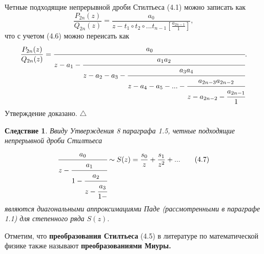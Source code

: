 \documentclass[12pt,a4paper]{article}
\theoremstyle{plain}   \newtheorem{Pro}{Задача}
\newtheorem{Cor}{Следствие}
\begin{document}
Четные подходящие непрерывной дроби Стилтьеса (4.1)
можно записать как
\begin{equation*}
  \frac{P_{2n}(z)}{Q_{2n}(z)}=
  \frac{a_0}
  {z-t_1 \circ t_2 \circ ... t_{n-1}
  [\frac{a_{2n-1}}{1}]},
\end{equation*}
что с учетом (4.6) можно переисать как
\begin{equation*}
  \frac{P_{2n}(z)}{Q_{2n}(z)}=
    \cfrac{a_0}{z-a_1 -
	  \cfrac{a_1 a_2}{z-a_2 -a_3 -
	    \cfrac{a_3 a_4}{z-a_4 -a_5 -...-
		  \cfrac{a_{2n-3}a_{2n-2}}{z-a_{2n-2}-
		    \cfrac{a_{2n-1}}{1
	}}}}}.
\end{equation*}
Утверждение доказано. $ \triangle $
\begin{Cor}
Ввиду Утверждения 8 параграфа 1.5,
четные подходящие непрерывной дроби Стилтьеса
\begin{equation*}
  \cfrac{a_0}{z-
    \cfrac{a_1}{1-
	  \cfrac{a_2}{z-
	    \cfrac{a_3}{1-
  }}}}
  \sim S(z)=\frac{s_0}{z}+\frac{s_1}{z^2}+...
  \qquad (4.7)
\end{equation*}
являются диагональными аппроксимациями Паде
(рассмотренными в параграфе 1.1)
для степенного ряда
$ S(z). $
\end{Cor}
Отметим, что
{\bfseries преобразования Стилтьеса}
(4.5) в литературе по математической физике также называют
{\bfseries преобразованиями Миуры.}
\newpage
\end{document}
